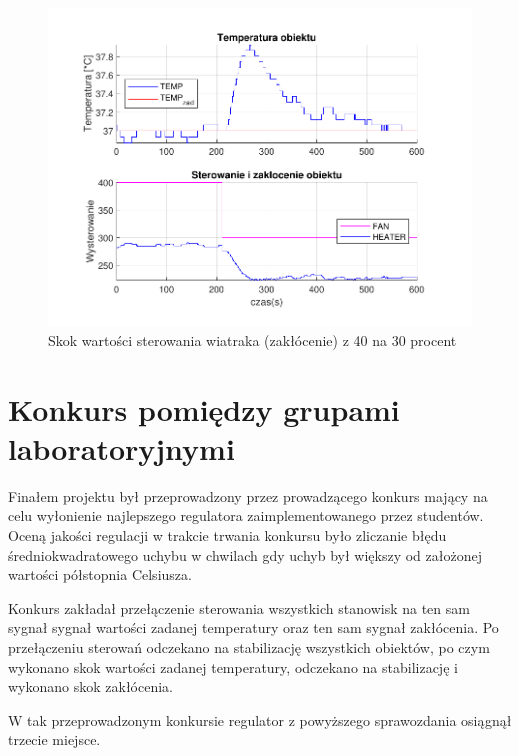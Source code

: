 \documentclass{mwrep}
\begin{document}
\begin{figure}[H]
\centering
\includegraphics[scale=0.85]{materialy/krystian_plots/4030wiatrak.pdf}
\caption{Skok wartości sterowania wiatraka (zakłócenie) z 40 na 30 procent}
\end{figure}


\section{Konkurs pomiędzy grupami laboratoryjnymi}
\label{eeee}
Finałem projektu był przeprowadzony przez prowadzącego konkurs mający na celu wyłonienie najlepszego regulatora zaimplementowanego przez studentów. Oceną jakości regulacji w trakcie trwania konkursu było zliczanie błędu średniokwadratowego uchybu w chwilach gdy uchyb był większy od założonej wartości półstopnia Celsiusza.

Konkurs zakładał przełączenie sterowania wszystkich stanowisk na ten sam sygnał sygnał wartości zadanej temperatury oraz ten sam sygnał zakłócenia.  Po przełączeniu sterowań odczekano na stabilizację wszystkich obiektów, po czym wykonano skok wartości zadanej temperatury, odczekano na stabilizację i wykonano skok zakłócenia. 

W tak przeprowadzonym konkursie regulator z powyższego sprawozdania osiągnął trzecie miejsce.
\end{document}
